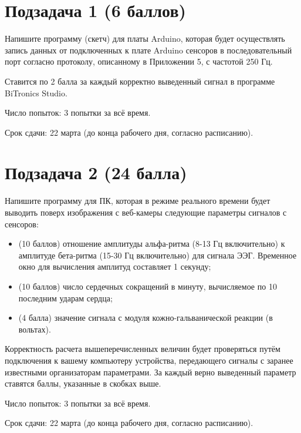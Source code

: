
\section*{Подзадача 1 (6 баллов)}

Напишите программу (скетч) для платы Arduino, которая будет осуществлять запись данных от подключенных к плате Arduino сенсоров в последовательный порт согласно протоколу, описанному в Приложении 5, с частотой 250 Гц.

\markSection

Ставится по 2 балла за каждый корректно выведенный сигнал в программе BiTronics Studio.

Число попыток: 3 попытки за всё время.

Срок сдачи: 22 марта (до конца рабочего дня, согласно расписанию).

\section*{Подзадача 2 (24 балла)}

Напишите программу для ПК, которая в режиме реального времени будет выводить поверх изображения с веб-камеры следующие параметры сигналов с сенсоров:
\begin{itemize}
    \item (10 баллов) отношение амплитуды альфа-ритма (8-13 Гц включительно) к амплитуде бета-ритма (15-30 Гц включительно) для сигнала ЭЭГ. Временное окно для вычисления амплитуд составляет 1 секунду;
    \item (10 баллов) число сердечных сокращений в минуту, вычисляемое по 10 последним ударам сердца;
    \item (4 балла) значение сигнала с модуля кожно-гальванической реакции (в вольтах).
\end{itemize}

\markSection

Корректность расчета вышеперечисленных величин будет проверяться путём подключения к вашему компьютеру устройства, передающего сигналы с заранее известными организаторам параметрами. За каждый верно выведенный параметр ставятся баллы, указанные в скобках выше. 

Число попыток: 3 попытки за всё время.

Срок сдачи: 22 марта (до конца рабочего дня, согласно расписанию).
